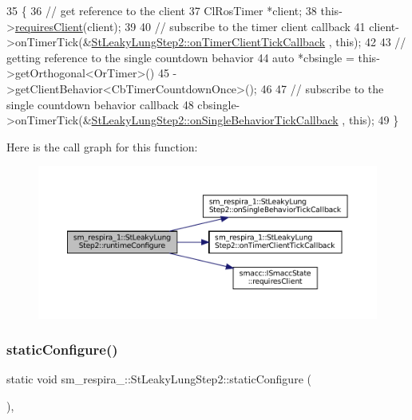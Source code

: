 \begin{DoxyCode}
35     \{
36         \textcolor{comment}{// get reference to the client}
37         ClRosTimer *client;
38         this->\hyperlink{classsmacc_1_1ISmaccState_a7f95c9f0a6ea2d6f18d1aec0519de4ac}{requiresClient}(client);
39 
40         \textcolor{comment}{// subscribe to the timer client callback}
41         client->onTimerTick(&\hyperlink{structsm__respira__1_1_1StLeakyLungStep2_ae8f613e81c6e1a1a2ad39fbb27dc7bea}{StLeakyLungStep2::onTimerClientTickCallback}
      , \textcolor{keyword}{this});
42 
43         \textcolor{comment}{// getting reference to the single countdown behavior}
44         \textcolor{keyword}{auto} *cbsingle = this->getOrthogonal<OrTimer>()
45                              ->getClientBehavior<CbTimerCountdownOnce>();
46 
47         \textcolor{comment}{// subscribe to the single countdown behavior callback}
48         cbsingle->onTimerTick(&\hyperlink{structsm__respira__1_1_1StLeakyLungStep2_a0961f0efffd2c0140dd9cfdbcf9a7160}{StLeakyLungStep2::onSingleBehaviorTickCallback}
      , \textcolor{keyword}{this});
49     \}
\end{DoxyCode}
Here is the call graph for this function\+:
\nopagebreak
\begin{figure}[H]
\begin{center}
\leavevmode
\includegraphics[width=350pt]{structsm__respira__1_1_1StLeakyLungStep2_a738290d02e5356fd5a49ae0bb5214e7e_cgraph}
\end{center}
\end{figure}
\mbox{\label{structsm__respira__1_1_1StLeakyLungStep2_a8b7e90d6934ff0806b5dec7938a734d1}} 
\subsubsection{\texorpdfstring{static\+Configure()}{staticConfigure()}}
{\footnotesize\ttfamily static void sm\+\_\+respira\+\_\+::\+St\+Leaky\+Lung\+Step2\+::static\+Configure (\begin{DoxyParamCaption}{ }\end{DoxyParamCaption})\hspace{0.3cm}{\ttfamily [inline]}, {\ttfamily [static]}}



